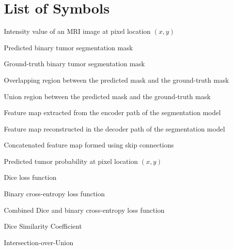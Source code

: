 \documentclass[a4paper,12pt]{article}
\newenvironment{symbols}{%
  \begin{list}{}{%
    \setlength{\labelwidth}{3.8cm}%
    \setlength{\leftmargin}{4.4cm}%
    \setlength{\labelsep}{0.5cm}%
    \setlength{\itemsep}{3pt}%
    \renewcommand{\makelabel}[1]{##1\hfil}%
  }%
}{%
  \end{list}%
}
\begin{document}
\section*{List of Symbols}
\begin{symbols}
    \item[$I(x,y)$]               Intensity value of an MRI image at pixel location $(x,y)$
    \item[$P$]                    Predicted binary tumor segmentation mask
    \item[$G$]                    Ground-truth binary tumor segmentation mask
    \item[$P \cap G$]             Overlapping region between the predicted mask and the ground-truth mask
    \item[$P \cup G$]             Union region between the predicted mask and the ground-truth mask
    \item[$S_e$]                  Feature map extracted from the encoder path of the segmentation model
    \item[$S_d$]                  Feature map reconstructed in the decoder path of the segmentation model
    \item[$S_C$]                  Concatenated feature map formed using skip connections
    \item[$p(x,y)$]               Predicted tumor probability at pixel location $(x,y)$
    \item[$\mathcal{L}_{Dice}$]   Dice loss function
    \item[$\mathcal{L}_{BCE}$]    Binary cross-entropy loss function
    \item[$\mathcal{L}_{DiceBCE}$] Combined Dice and binary cross-entropy loss function
    \item[$DSC$]                  Dice Similarity Coefficient
    \item[$IoU$]                  Intersection-over-Union
\end{symbols}

\newpage
{}
\end{document}
